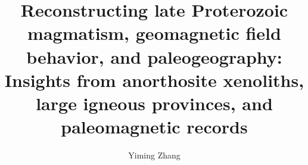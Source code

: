 \documentclass{ucbthesis}
\begin{document}

\title{Reconstructing late Proterozoic magmatism, geomagnetic field behavior, and paleogeography: Insights from anorthosite xenoliths, large igneous provinces, and paleomagnetic records}
\author{Yiming Zhang}



\maketitle
\copyrightpage


\end{document}
